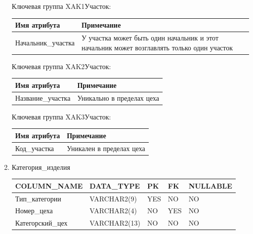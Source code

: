 \begin{enumerate}
\begin{tabular}{|p{7cm}|p{9.3cm}|}
    \end{tabular}

    Ключевая группа XAK1Участок:

    \begin{tabular}{|p{7cm}|p{9.3cm}|} \hline

        {\bf Имя атрибута} & {\bf Примечание} \\ \hline
        Начальник\_участка & У участка может быть один начальник и этот начальник может возглавлять только один участок \\ \hline

    \end{tabular}

    Ключевая группа XAK2Участок:

    \begin{tabular}{|p{7cm}|p{9.3cm}|} \hline

        {\bf Имя атрибута} & {\bf Примечание} \\ \hline
        Название\_участка & Уникально в пределах цеха \\ \hline

    \end{tabular}

    Ключевая группа XAK3Участок:

    \begin{tabular}{|p{7cm}|p{9.3cm}|} \hline

        {\bf Имя атрибута} & {\bf Примечание} \\ \hline
        Код\_участка & Уникален в пределах цеха \\ \hline

    \end{tabular}

    \item{Категория\_изделия}

    \begin{tabular}{|p{7cm}|p{3cm}|p{1cm}|p{1cm}|p{3cm}|} \hline

        {\bf COLUMN\_NAME} & {\bf DATA\_TYPE} & {\bf PK} & {\bf FK} & {\bf NULLABLE} \\ \hline
        Тип\_категории & VARCHAR2(9) & YES & NO & NO \\ \hline
        Номер\_цеха & VARCHAR2(4) & NO & YES & NO \\ \hline
        Категорский\_цех & VARCHAR2(13) & NO & NO & NO \\ \hline

    \end{tabular}


\end{enumerate}
